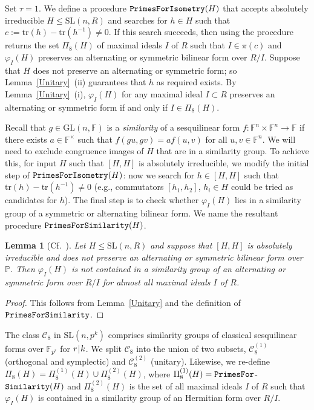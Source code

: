 \documentclass[11pt]{amsart}
\newtheorem{lemma}[theorem]{Lemma}
\theoremstyle{definition}
\theoremstyle{remark}
\newcommand{\F}{\mathbb{F}}
\renewcommand{\P}{\mathbb{P}}
\newcommand{\GL}{\mathrm{GL}}
\newcommand{\SL}{\mathrm{SL}}
\newcommand{\tr}{\mathrm{tr}}
\newcommand{\calc}{\mathscr{C}}
\begin{document}
Set $\tau = 1$. We define a procedure ${\tt PrimesForIsometry}(H)$
that accepts absolutely irreducible $H\leq \SL(n,R)$ and
searches for $h \in H$ such that $c := \tr(h) - \tr(h^{-1}) \neq 0$. 
If this search succeeds, then using \cite{NSrecog} the procedure
returns the set $\Pi_8(H)$ of maximal ideals $I$ of $R$ such that 
$I \in \pi(c)$ and  $\varphi_I(H)$ preserves an alternating or 
symmetric bilinear form over $R/I$.
 Suppose that $H$ does not preserve an alternating or symmetric 
form; so Lemma~\ref{Unitary}~(ii) guarantees that $h$ as required 
exists. By Lemma~\ref{Unitary}~(i), $\varphi_I(H)$ for any maximal 
ideal $I\subset R$ preserves an alternating or symmetric form if and 
only if $I \in \Pi_8(H)$.

Recall that $g\in \GL(n,\F)$ is a \emph{similarity} of a
sesquilinear form $f\colon \F^n\times \F^n\rightarrow \F$
if there exists $a\in \allowbreak \F^\times$ such 
that $f(gu,gv) = a f(u,v)$ for all $u, v\in \F^n$. We will 
need to exclude congruence images of $H$ that are in a 
similarity group. To achieve this, for input $H$ such that 
$[H,H]$ is absolutely irreducible, we modify the initial step 
of ${\tt PrimesForIsometry}(H)$: now we search for $h\in [H,H]$ 
such that $\tr(h) - \tr(h^{-1}) \neq 0$ (e.g., commutators 
$[h_1,h_2]$, $h_i\in H$ could be tried as candidates for $h$).
 The final step is to check whether $\varphi_I(H)$ 
lies in a similarity group of a symmetric or alternating bilinear 
form. We name the resultant procedure
 ${\tt PrimesForSimilarity}(H)$. 
\begin{lemma}[{Cf.~\cite[Lemma~2.10]{ExpMath}}] 
\label{iso1}
Let $H\leq \SL(n,R)$ and suppose that $[H,H]$ is absolutely 
irreducible and does not preserve an alternating or symmetric 
bilinear form over $\P$. Then $\varphi_I(H)$ is not 
contained in a similarity group of an alternating or symmetric 
form over $R/I$ for almost all maximal 
ideals $I$ of $R$.
\end{lemma}
\begin{proof}
This follows from Lemma~\ref{Unitary} and the definition of
 $\tt PrimesForSimilarity$.
\end{proof}

The class $\calc_8$ in $\SL(n,p^k)$ comprises similarity 
groups of classical sesquilinear forms over $\F_{p^r}$ for 
$r\hspace{.5pt} |\hspace{.5pt}k$.
We split $\calc_8$ into the union of two subsets, $\calc_8^{(1)}$ 
(orthogonal and symplectic) and $\calc_8^{(2)}$ (unitary). 
Likewise, we re-define $\Pi_8 (H)= \Pi_8^{(1)}(H) \cup \Pi_8^{(2)}(H)$,
where $\Pi_8^{(1)}(H)= {\tt PrimesFor}$-${\tt Similarity}(H)$ and 
$\Pi_8^{(2)}(H)$ is the set of all maximal ideals $I$ of $R$ such that  
$\varphi_I(H)$ is contained in a similarity group of an Hermitian form 
over $R/I$.
\end{document}
